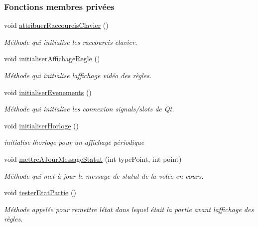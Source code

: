 \subsubsection*{Fonctions membres privées}
\begin{DoxyCompactItemize}
\item 
void \hyperlink{class_ihm_a2b7dbb2d087d4ca15cee9707a1796b62}{attribuer\+Raccourcis\+Clavier} ()
\begin{DoxyCompactList}\small\item\em Méthode qui initialise les raccourcis clavier. \end{DoxyCompactList}\item 
void \hyperlink{class_ihm_a97b1938c38eef2427b5cf2326feeef3d}{initialiser\+Affichage\+Regle} ()
\begin{DoxyCompactList}\small\item\em Méthode qui initialise l\textquotesingle{}affichage vidéo des règles. \end{DoxyCompactList}\item 
void \hyperlink{class_ihm_a9df8990148a898f728304a4e789be2a6}{initialiser\+Evenements} ()
\begin{DoxyCompactList}\small\item\em Méthode qui initialise les connexion signals/slots de Qt. \end{DoxyCompactList}\item 
void \hyperlink{class_ihm_aa5a3e97de39e919ea8807d30167da510}{initialiser\+Horloge} ()
\begin{DoxyCompactList}\small\item\em initialise l\textquotesingle{}horloge pour un affichage périodique \end{DoxyCompactList}\item 
void \hyperlink{class_ihm_ab80e655c95fca8e1113343bdbd3d3586}{mettre\+A\+Jour\+Message\+Statut} (int type\+Point, int point)
\begin{DoxyCompactList}\small\item\em Méthode qui met à jour le message de statut de la volée en cours. \end{DoxyCompactList}\item 
void \hyperlink{class_ihm_a8dbd08db43f7c80ca7266cc6b162f571}{tester\+Etat\+Partie} ()
\begin{DoxyCompactList}\small\item\em Méthode appelée pour remettre l\textquotesingle{}état dans lequel était la partie avant l\textquotesingle{}affichage des règles. \end{DoxyCompactList}\end{DoxyCompactItemize}
